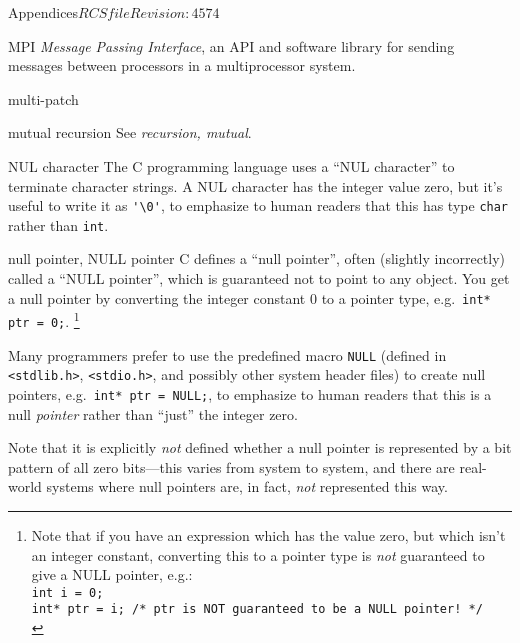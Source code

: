 \begin{cactuspart}{Appendices}{$RCSfile$}{$Revision: 4574 $}
\begin{Lentry}
\item[MPI]
  \textit{Message Passing Interface}, an API and software library for sending
  messages between processors in a multiprocessor system.
\item[multi-patch]
\item[mutual recursion]
  See \textit{recursion, mutual}.
\item[NUL character]
  The C programming language uses a ``NUL character'' to terminate
  character strings.  A NUL character has the integer value zero, but
  it's useful to write it as \verb|'\0'|, to emphasize to human readers
  that this has type \verb|char| rather than \verb|int|.
\item[null pointer, NULL pointer]
  C defines a ``null pointer'', often (slightly incorrectly) called
  a ``NULL pointer'', which is guaranteed not to point to any object.
  You get a null pointer by converting the integer constant 0 to a
  pointer type, e.g.\ \verb|int* ptr = 0;|.%
\footnote{%
       Note that if you have an expression which
       has the value zero, but which isn't an
       integer constant, converting this to a
       pointer type is \emph{not} guaranteed to
       give a NULL pointer, e.g.:\\
       {\tt int i = 0;}\\
       {\tt int* ptr = i;     /* ptr is NOT guaranteed to be a NULL pointer! */}\\
       }%

  Many programmers prefer to use the predefined macro \verb|NULL|
  (defined in \verb|<stdlib.h>|, \verb|<stdio.h>|, and possibly other
  system header files) to create null pointers,
  e.g.\ \verb|int* ptr = NULL;|, to emphasize to human readers that
  this is a null \emph{pointer} rather than ``just'' the integer zero.

  Note that it is explicitly \emph{not} defined whether a null pointer
  is represented by a bit pattern of all zero bits---this varies from
  system to system, and there are real-world systems where null pointers
  are, in fact, \emph{not} represented this way.


\end{Lentry}
\end{cactuspart}
